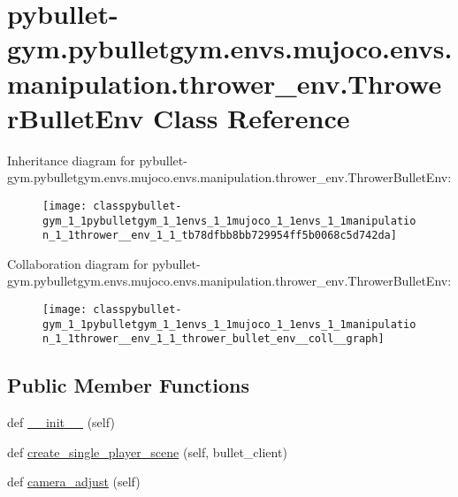 \hypertarget{classpybullet-gym_1_1pybulletgym_1_1envs_1_1mujoco_1_1envs_1_1manipulation_1_1thrower__env_1_1_thrower_bullet_env}{}\section{pybullet-\/gym.pybulletgym.\+envs.\+mujoco.\+envs.\+manipulation.\+thrower\+\_\+env.\+Thrower\+Bullet\+Env Class Reference}
\label{classpybullet-gym_1_1pybulletgym_1_1envs_1_1mujoco_1_1envs_1_1manipulation_1_1thrower__env_1_1_thrower_bullet_env}


Inheritance diagram for pybullet-\/gym.pybulletgym.\+envs.\+mujoco.\+envs.\+manipulation.\+thrower\+\_\+env.\+Thrower\+Bullet\+Env\+:
\nopagebreak
\begin{figure}[H]
\begin{center}
\leavevmode
\texttt{[image: classpybullet-gym\_1\_1pybulletgym\_1\_1envs\_1\_1mujoco\_1\_1envs\_1\_1manipulation\_1\_1thrower\_\_env\_1\_1\_tb78dfbb8bb729954ff5b0068c5d742da]}
\end{center}
\end{figure}


Collaboration diagram for pybullet-\/gym.pybulletgym.\+envs.\+mujoco.\+envs.\+manipulation.\+thrower\+\_\+env.\+Thrower\+Bullet\+Env\+:
\nopagebreak
\begin{figure}[H]
\begin{center}
\leavevmode
\texttt{[image: classpybullet-gym\_1\_1pybulletgym\_1\_1envs\_1\_1mujoco\_1\_1envs\_1\_1manipulation\_1\_1thrower\_\_env\_1\_1\_thrower\_bullet\_env\_\_coll\_\_graph]}
\end{center}
\end{figure}
\subsection*{Public Member Functions}
\begin{DoxyCompactItemize}
\item 
def \hyperlink{classpybullet-gym_1_1pybulletgym_1_1envs_1_1mujoco_1_1envs_1_1manipulation_1_1thrower__env_1_1_thrower_bullet_env_a95a2086a04fa9efd30cdaa9d36e9b672}{\+\_\+\+\_\+init\+\_\+\+\_\+} (self)
\item 
def \hyperlink{classpybullet-gym_1_1pybulletgym_1_1envs_1_1mujoco_1_1envs_1_1manipulation_1_1thrower__env_1_1_thrower_bullet_env_aade11f8f356b20a3959ce952d0f61c52}{create\+\_\+single\+\_\+player\+\_\+scene} (self, bullet\+\_\+client)
\item 
def \hyperlink{classpybullet-gym_1_1pybulletgym_1_1envs_1_1mujoco_1_1envs_1_1manipulation_1_1thrower__env_1_1_thrower_bullet_env_ac2cae686b484bd69957b359a6bf528bc}{camera\+\_\+adjust} (self)
\end{DoxyCompactItemize}
